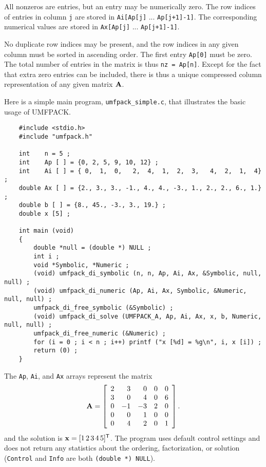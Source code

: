 \documentclass[11pt]{article}
\newcommand{\m}[1]{{\bf{#1}}}       %
\newcommand{\tr}{^{\sf T}}          %
\begin{document}
All nonzeros are entries, but an entry may be numerically zero.  The row indices
of entries in column {\tt j} are stored in
    {\tt Ai[Ap[j]} ... {\tt Ap[j+1]-1]}.
The corresponding numerical values are stored in
    {\tt Ax[Ap[j]} ... {\tt Ap[j+1]-1]}.

No duplicate row indices may be present, and the row indices in any given
column must be sorted in ascending order.  The first entry {\tt Ap[0]} must be
zero.  The total number of entries in the matrix is thus {\tt nz = Ap[n]}.
Except for the fact that extra zero entries can be included, there is thus a
unique compressed column representation of any given matrix $\m{A}$.

Here is a simple main program, {\tt umfpack\_simple.c}, that illustrates the
basic usage of UMFPACK.

{\footnotesize
\begin{verbatim}
    #include <stdio.h>
    #include "umfpack.h"

    int    n = 5 ;
    int    Ap [ ] = {0, 2, 5, 9, 10, 12} ;
    int    Ai [ ] = { 0,  1,  0,   2,  4,  1,  2,  3,   4,  2,  1,  4} ;
    double Ax [ ] = {2., 3., 3., -1., 4., 4., -3., 1., 2., 2., 6., 1.} ;
    double b [ ] = {8., 45., -3., 3., 19.} ;
    double x [5] ;

    int main (void)
    {
        double *null = (double *) NULL ;
        int i ;
        void *Symbolic, *Numeric ;
        (void) umfpack_di_symbolic (n, n, Ap, Ai, Ax, &Symbolic, null, null) ;
        (void) umfpack_di_numeric (Ap, Ai, Ax, Symbolic, &Numeric, null, null) ;
        umfpack_di_free_symbolic (&Symbolic) ;
        (void) umfpack_di_solve (UMFPACK_A, Ap, Ai, Ax, x, b, Numeric, null, null) ;
        umfpack_di_free_numeric (&Numeric) ;
        for (i = 0 ; i < n ; i++) printf ("x [%d] = %g\n", i, x [i]) ;
        return (0) ;
    }
\end{verbatim}
}

The {\tt Ap}, {\tt Ai}, and {\tt Ax} arrays represent the matrix
\[
\m{A} = \left[
\begin{array}{rrrrr}
 2 &  3 &  0 &  0 &  0 \\
 3 &  0 &  4 &  0 &  6 \\
 0 & -1 & -3 &  2 &  0 \\
 0 &  0 &  1 &  0 &  0 \\
 0 &  4 &  2 &  0 &  1 \\
\end{array}
\right].
\]
and the solution is $\m{x} = [1 \, 2 \, 3 \, 4 \, 5]\tr$.  The program uses
default control settings and does not return any statistics about the ordering,
factorization, or solution ({\tt Control} and {\tt Info} are both
{\tt (double *) NULL}).
\end{document}

